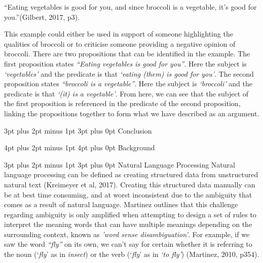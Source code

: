 \documentclass[12pt,a4paper]{article}
\makeatletter
\renewcommand\subsection{\@startsection {subsection}{1}{2mm} %
                               {3pt plus 2pt minus 1pt} %
                               {3pt plus 0pt} %
                               {\normalfont\bfseries}}
\renewcommand\section{\@startsection {section}{1}{0mm} %
                               {4pt plus 2pt minus 1pt} %
                               {4pt plus 0pt} %
                               {\bfseries}}
\makeatother
\begin{document}
``Eating vegetables is good for you, and since broccoli is a vegetable, it's good for you.''(Gilbert, 2017, p3).\newline

This example could either be used in support of someone highlighting the qualities of broccoli or to criticise someone providing a negative opinion of broccoli. There are two propositions that can be identified in the example. The first proposition states \emph{``Eating vegetables is good for you''}. Here the subject is \emph{`vegetables'} and the predicate is that \emph{`eating (them) is good for you'}. The second proposition states \emph{``broccoli is a vegetable''}. Here the subject is \emph{`broccoli'} and the predicate is that \emph{`(it) is a vegetable'}.  From here, we can see that the subject of the first proposition is referenced in the predicate of the second proposition, linking the propositions together to form what we have described as an argument. \newline

\subsection{Conclusion}

\newpage

\section{Background}

\subsection{Natural Language Processing}
Natural language processing can be defined as creating structured data from unstructured natural text (Kreimeyer et al, 2017). Creating this structured data manually can be at best time consuming, and at worst inconsistent due to the ambiguity that comes as a result of natural language. Martinez outlines that this challenge regarding ambiguity is only amplified when attempting to design a set of rules to interpret the meaning words that can have multiple meanings depending on the surrounding context, known as \emph{'word sense disambiguation'}. For example, if we saw the word \emph{``fly''} on its own, we can't say for certain whether it is referring to the noun (`\emph{fly}' as in \emph{insect}) or the verb (`\emph{fly}' as in \emph{`to fly'}) (Martinez, 2010, p354).\newline
\end{document}
